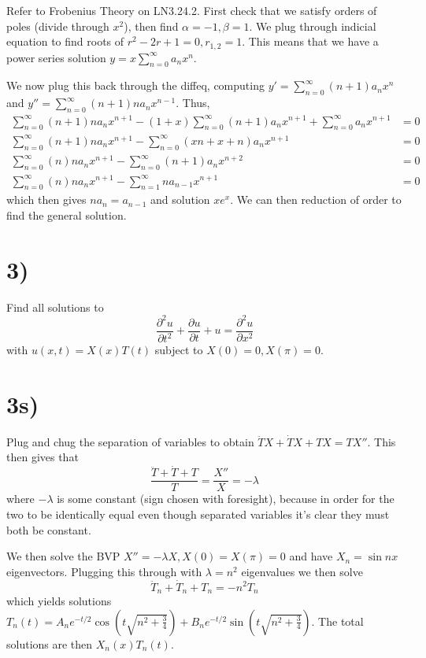 \documentclass[10pt,twocolumn]{article}
\newcommand{\pd}[2]{\frac{\partial #1}{\partial#2}}
\newcommand{\ptd}[2]{\frac{\partial^2 #1}{\partial#2^2}}
\begin{document}
Refer to Frobenius Theory on LN3.24.2. First check that we satisfy orders of poles (divide through $x^2$), then find $\alpha = -1, \beta = 1$. We plug through indicial equation to find roots of $r^2 - 2r + 1 = 0, r_{1,2} = 1$. This means that we have a power series solution $y=x\sum_{n=0}^\infty a_nx^n$.

We now plug this back through the diffeq, computing $y' = \sum_{n=0}^\infty (n+1)a_n x^n$ and $y'' = \sum_{n=0}^\infty (n+1)na_nx^{n-1}$. Thus,
\begin{align*}
    \sum_{n=0}^\infty(n+1)na_nx^{n+1} - (1+x)\sum_{n=0}^\infty(n+1)a_nx^{n+1} + \sum_{n=0}^\infty a_nx^{n+1} &= 0\\
    \sum_{n=0}^\infty(n+1)na_nx^{n+1} - \sum_{n=0}^\infty(xn + x + n)a_nx^{n+1}&= 0\\
    \sum_{n=0}^\infty(n)na_nx^{n+1} - \sum_{n=0}^\infty(n + 1)a_nx^{n+2}&= 0\\
    \sum_{n=0}^\infty(n)na_nx^{n+1} - \sum_{n=1}^\infty na_{n-1}x^{n+1}&= 0
\end{align*}
which then gives $na_n = a_{n-1}$ and solution $xe^x$. We can then reduction of order to find the general solution.

\section*{3)}

Find all solutions to
$$\ptd{u}{t} + \pd{u}{t} + u = \ptd{u}{x}$$
with $u(x,t) = X(x) T(t)$ subject to $X(0) = 0, X(\pi) = 0$.

\section*{3s)}

Plug and chug the separation of variables to obtain $\ddot{T}X + \dot{T}X + TX = TX''$. This then gives that
$$\frac{\ddot{T} + \dot{T} + T}{T} = \frac{X''}{X} = -\lambda$$
where $-\lambda$ is some constant (sign chosen with foresight), because in order for the two to be identically equal even though separated variables it's clear they must both be constant. 

We then solve the BVP $X'' = -\lambda X, X(0) = X(\pi) = 0$ and have $X_n = \sin nx$ eigenvectors. Plugging this through with $\lambda = n^2$ eigenvalues we then solve
$$\ddot{T}_n + \dot{T}_n + T_n = -n^2T_n$$
which yields solutions $T_n(t) = A_ne^{-t/2}\cos \left( t\sqrt{n^2+\frac{3}{4}} \right) + B_ne^{-t/2}\sin\left( t\sqrt{n^2 + \frac{3}{4}} \right)$. The total solutions are then $X_n(x) T_n(t)$.
\end{document}
